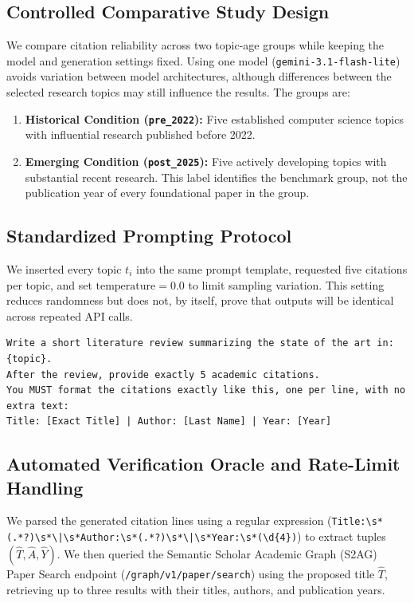\documentclass[manuscript,screen]{acmart}
\begin{document}
\subsection{Controlled Comparative Study Design}
We compare citation reliability across two topic-age groups while keeping the model and generation settings fixed. Using one model (\texttt{gemini-3.1-flash-lite}) avoids variation between model architectures, although differences between the selected research topics may still influence the results. The groups are:
\begin{enumerate}
    \item \textbf{Historical Condition (\texttt{pre\_2022}):} Five established computer science topics with influential research published before 2022.
    \item \textbf{Emerging Condition (\texttt{post\_2025}):} Five actively developing topics with substantial recent research. This label identifies the benchmark group, not the publication year of every foundational paper in the group.
\end{enumerate}

\subsection{Standardized Prompting Protocol}
We inserted every topic $t_i$ into the same prompt template, requested five citations per topic, and set $\text{temperature} = 0.0$ to limit sampling variation. This setting reduces randomness but does not, by itself, prove that outputs will be identical across repeated API calls.

\begin{lstlisting}
Write a short literature review summarizing the state of the art in: {topic}.
After the review, provide exactly 5 academic citations.
You MUST format the citations exactly like this, one per line, with no extra text:
Title: [Exact Title] | Author: [Last Name] | Year: [Year]
\end{lstlisting}

\subsection{Automated Verification Oracle and Rate-Limit Handling}
We parsed the generated citation lines using a regular expression (\texttt{Title:\textbackslash s*(.*?)\textbackslash s*\textbackslash |\textbackslash s*Author:\textbackslash s*(.*?)\textbackslash s*\textbackslash |\textbackslash s*Year:\textbackslash s*(\textbackslash d\{4\})}) to extract tuples $(\hat{T}, \hat{A}, \hat{Y})$. We then queried the Semantic Scholar Academic Graph (S2AG) Paper Search endpoint (\texttt{/graph/v1/paper/search}) using the proposed title $\hat{T}$, retrieving up to three results with their titles, authors, and publication years.
\end{document}
